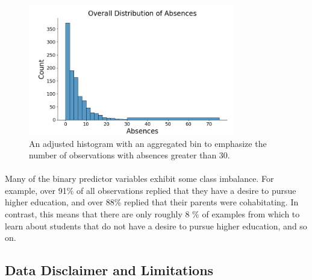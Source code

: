 \documentclass[12pt, titlepage]{article}
\begin{document}
	\begin{figure}[h!]
		\centering
		\includegraphics[width = 0.8\textwidth]{fig/Histogram.png}
		\caption{An adjusted histogram with an aggregated bin to emphasize the number of observations with absences greater than 30.}
		\label{histogram}
	\end{figure}
	
	\paragraph{} Many of the binary predictor variables exhibit some class imbalance. For example, over 91\% of all observations replied that they have a desire to pursue higher education, and over 88\% replied that their parents were cohabitating. In contrast, this means that there are only roughly 8 \% of examples from which to learn about students that do not have a desire to pursue higher education, and so on. 
	
	\subsection{Data Disclaimer and Limitations}
\end{document}
